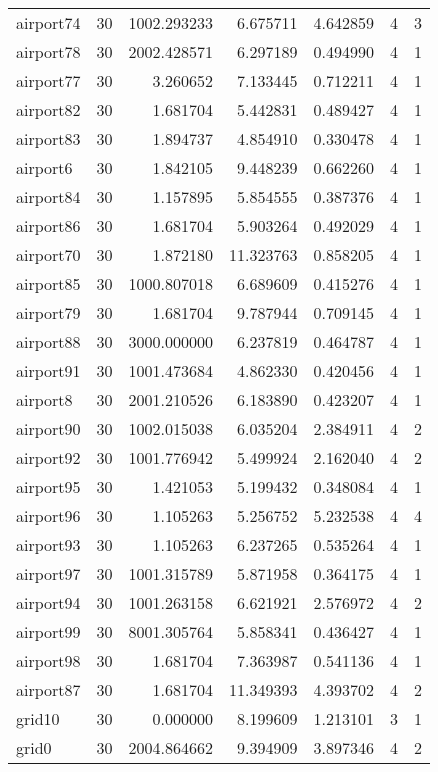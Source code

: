 \begin{longtable}{|l|r|r|r|r|r|r|}
airport74 & 30 & 1002.293233 & 6.675711 & 4.642859 & 4 & 3 \\
airport78 & 30 & 2002.428571 & 6.297189 & 0.494990 & 4 & 1 \\
airport77 & 30 & 3.260652 & 7.133445 & 0.712211 & 4 & 1 \\
airport82 & 30 & 1.681704 & 5.442831 & 0.489427 & 4 & 1 \\
airport83 & 30 & 1.894737 & 4.854910 & 0.330478 & 4 & 1 \\
airport6 & 30 & 1.842105 & 9.448239 & 0.662260 & 4 & 1 \\
airport84 & 30 & 1.157895 & 5.854555 & 0.387376 & 4 & 1 \\
airport86 & 30 & 1.681704 & 5.903264 & 0.492029 & 4 & 1 \\
airport70 & 30 & 1.872180 & 11.323763 & 0.858205 & 4 & 1 \\
airport85 & 30 & 1000.807018 & 6.689609 & 0.415276 & 4 & 1 \\
airport79 & 30 & 1.681704 & 9.787944 & 0.709145 & 4 & 1 \\
airport88 & 30 & 3000.000000 & 6.237819 & 0.464787 & 4 & 1 \\
airport91 & 30 & 1001.473684 & 4.862330 & 0.420456 & 4 & 1 \\
airport8 & 30 & 2001.210526 & 6.183890 & 0.423207 & 4 & 1 \\
airport90 & 30 & 1002.015038 & 6.035204 & 2.384911 & 4 & 2 \\
airport92 & 30 & 1001.776942 & 5.499924 & 2.162040 & 4 & 2 \\
airport95 & 30 & 1.421053 & 5.199432 & 0.348084 & 4 & 1 \\
airport96 & 30 & 1.105263 & 5.256752 & 5.232538 & 4 & 4 \\
airport93 & 30 & 1.105263 & 6.237265 & 0.535264 & 4 & 1 \\
airport97 & 30 & 1001.315789 & 5.871958 & 0.364175 & 4 & 1 \\
airport94 & 30 & 1001.263158 & 6.621921 & 2.576972 & 4 & 2 \\
airport99 & 30 & 8001.305764 & 5.858341 & 0.436427 & 4 & 1 \\
airport98 & 30 & 1.681704 & 7.363987 & 0.541136 & 4 & 1 \\
airport87 & 30 & 1.681704 & 11.349393 & 4.393702 & 4 & 2 \\
grid10 & 30 & 0.000000 & 8.199609 & 1.213101 & 3 & 1 \\
grid0 & 30 & 2004.864662 & 9.394909 & 3.897346 & 4 & 2 \\

\end{longtable}
